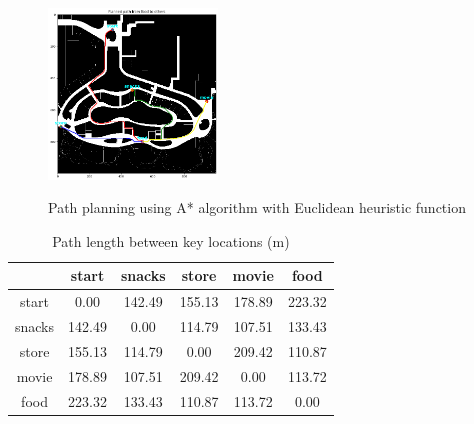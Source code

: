 \documentclass[hyperref]{article}
\theoremstyle{nonumberplain}
\begin{document}
\begin{figure}[H]
\begin{minipage}[t]{0.45\textwidth}
		\label{fig2d}
	\end{minipage}
	\begin{minipage}[t]{0.45\textwidth}
		\centering
		\includegraphics[width=4.5cm]{food_to_others.png}
		\label{fig2e}
	\end{minipage}
	\caption{Path planning using A* algorithm with Euclidean heuristic function}
	\label{fig2}
\end{figure} 


\begin{table}[H]
	\centering
	\begin{minipage}[c]{0.8\textwidth}
		\centering
		\caption{Path length between key locations (m)}
		\begin{tabular}{|c|c|c|c|c|c|}
			\hline
			\diagbox{To}{From} &start &snacks &store &movie &food \\
			\hline
			start &0.00 &142.49 &155.13 &178.89 &223.32 \\
			\hline
			snacks &142.49 &0.00 &114.79 &107.51 &133.43 \\
			\hline
			store &155.13 &114.79 &0.00 &209.42 &110.87 \\
			\hline
			movie &178.89 &107.51 &209.42 &0.00 &113.72 \\
			\hline
			food &223.32 &133.43 &110.87 &113.72 &0.00 \\
			\hline
		\end{tabular}
		\label{tab1}
	\end{minipage}
\end{table}
\end{document}
